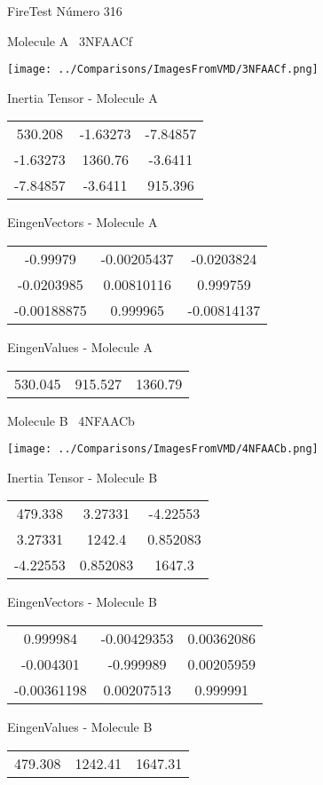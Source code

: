 \vtab[-3cm]
\begin{center}
{\large FireTest \tab Número 316}
\end{center}
\begin{multicols}{2}
\begin{center}

Molecule A \
3NFAACf

\texttt{[image: ../Comparisons/ImagesFromVMD/3NFAACf.png]}

Inertia Tensor - Molecule A \\
\begin{tabular}{|c c c|}
530.208	 & 	-1.63273	 & 	-7.84857	 \\
-1.63273	 & 	1360.76	 & 	-3.6411	 \\
-7.84857	 & 	-3.6411	 & 	915.396
\end{tabular}

\vtab
 EingenVectors - Molecule A     \\
\begin{tabular}{|c c c|}
-0.99979	 & 	-0.00205437	 & 	-0.0203824	 \\
-0.0203985	 & 	0.00810116	 & 	0.999759	 \\
-0.00188875	 & 	0.999965	 & 	-0.00814137
\end{tabular}

\vtab
 EingenValues - Molecule A     \\
\begin{tabular}{|c c c|}
530.045	 & 	915.527	 & 	1360.79	 \\
\end{tabular}
\columnbreak

Molecule B \
4NFAACb

\texttt{[image: ../Comparisons/ImagesFromVMD/4NFAACb.png]}

Inertia Tensor - Molecule B \\
\begin{tabular}{|c c c|}
479.338	 & 	3.27331	 & 	-4.22553	 \\
3.27331	 & 	1242.4	 & 	0.852083	 \\
-4.22553	 & 	0.852083	 & 	1647.3
\end{tabular}

\vtab
 EingenVectors - Molecule B     \\
\begin{tabular}{|c c c|}
0.999984	 & 	-0.00429353	 & 	0.00362086	 \\
-0.004301	 & 	-0.999989	 & 	0.00205959	 \\
-0.00361198	 & 	0.00207513	 & 	0.999991
\end{tabular}

\vtab
 EingenValues - Molecule B     \\
\begin{tabular}{|c c c|}
479.308	 & 	1242.41	 & 	1647.31	 \\
\end{tabular}

\end{center}
\end{multicols}

